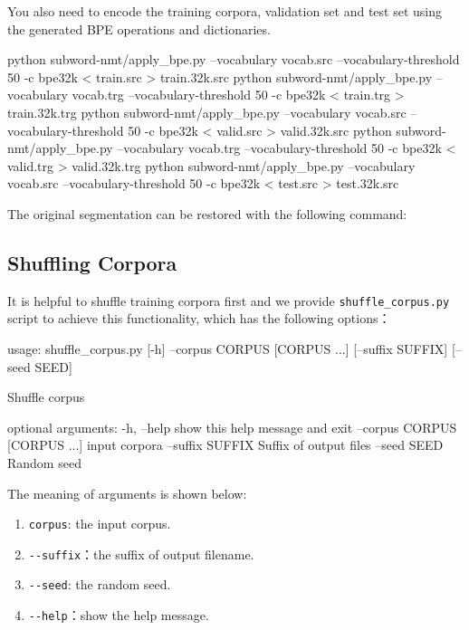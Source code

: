 \documentclass{article}
\begin{document}
You also need to encode the training corpora, validation set and test set using the generated BPE operations and dictionaries. 
\begin{everbatim}
  python subword-nmt/apply_bpe.py 
    --vocabulary vocab.src 
    --vocabulary-threshold 50 
    -c bpe32k < train.src > train.32k.src
  python subword-nmt/apply_bpe.py
    --vocabulary vocab.trg 
    --vocabulary-threshold 50
    -c bpe32k < train.trg > train.32k.trg
  python subword-nmt/apply_bpe.py
    --vocabulary vocab.src
    --vocabulary-threshold 50
    -c bpe32k < valid.src > valid.32k.src
  python subword-nmt/apply_bpe.py 
    --vocabulary vocab.trg --vocabulary-threshold 50 
    -c bpe32k < valid.trg > valid.32k.trg
  python subword-nmt/apply_bpe.py
    --vocabulary vocab.src 
    --vocabulary-threshold 50 
    -c bpe32k < test.src > test.32k.src
\end{everbatim}
The original segmentation can be restored with the following command:


\subsection{Shuffling Corpora}
It is helpful to shuffle training corpora first and we provide \verb|shuffle_corpus.py| script to achieve this functionality, which has the following options：
\begin{everbatim}
usage: shuffle_corpus.py [-h] --corpus CORPUS [CORPUS ...] 
                         [--suffix SUFFIX]
                         [--seed SEED]

Shuffle corpus

optional arguments:
  -h, --help            show this help message and exit
  --corpus CORPUS [CORPUS ...]
                        input corpora
  --suffix SUFFIX       Suffix of output files
  --seed SEED           Random seed
\end{everbatim}

The meaning of arguments is shown below:
\begin{enumerate}
\item \verb|corpus|: the input corpus.
\item \verb|--suffix|：the suffix of output filename.
\item \verb|--seed|: the random seed.
\item \verb|--help|：show the help message.
\end{enumerate}
\end{document}
